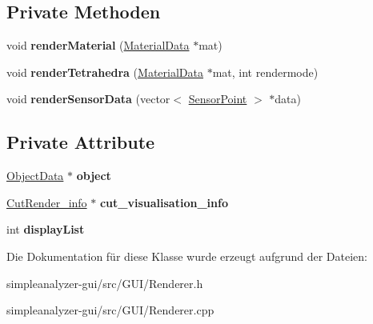 \subsection*{Private Methoden}
\begin{DoxyCompactItemize}
\item 
\hypertarget{classRenderer_a5590ecdd9e913a59313c5612b5d4d2bd}{void {\bfseries render\-Material} (\hyperlink{structMaterialData}{Material\-Data} $\ast$mat)}\label{classRenderer_a5590ecdd9e913a59313c5612b5d4d2bd}

\item 
\hypertarget{classRenderer_acfb25891ff9341a9d5834105e711e162}{void {\bfseries render\-Tetrahedra} (\hyperlink{structMaterialData}{Material\-Data} $\ast$mat, int rendermode)}\label{classRenderer_acfb25891ff9341a9d5834105e711e162}

\item 
\hypertarget{classRenderer_ad2eac0343aef1abd05ed95b1b364785f}{void {\bfseries render\-Sensor\-Data} (vector$<$ \hyperlink{structUtils_1_1SensorPoint}{Sensor\-Point} $>$ $\ast$data)}\label{classRenderer_ad2eac0343aef1abd05ed95b1b364785f}

\end{DoxyCompactItemize}
\subsection*{Private Attribute}
\begin{DoxyCompactItemize}
\item 
\hypertarget{classRenderer_a4ad4a42fe6bfd32ff3ef4bb1d59f8f96}{\hyperlink{classObjectData}{Object\-Data} $\ast$ {\bfseries object}}\label{classRenderer_a4ad4a42fe6bfd32ff3ef4bb1d59f8f96}

\item 
\hypertarget{classRenderer_a119b7d1e3eb740a118e269758dd1a906}{\hyperlink{structUtils_1_1CutRender__info}{Cut\-Render\-\_\-info} $\ast$ {\bfseries cut\-\_\-visualisation\-\_\-info}}\label{classRenderer_a119b7d1e3eb740a118e269758dd1a906}

\item 
\hypertarget{classRenderer_a165ec913fa058d0a38f5e7b7635adfd2}{int {\bfseries display\-List}}\label{classRenderer_a165ec913fa058d0a38f5e7b7635adfd2}

\end{DoxyCompactItemize}


Die Dokumentation für diese Klasse wurde erzeugt aufgrund der Dateien\-:\begin{DoxyCompactItemize}
\item 
simpleanalyzer-\/gui/src/\-G\-U\-I/Renderer.\-h\item 
simpleanalyzer-\/gui/src/\-G\-U\-I/Renderer.\-cpp\end{DoxyCompactItemize}
